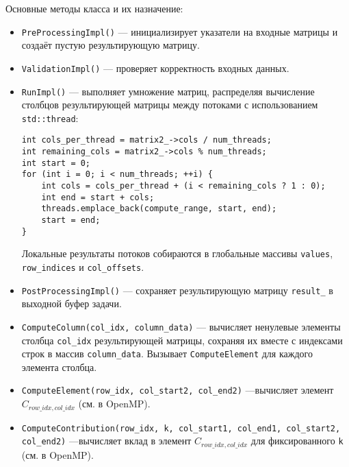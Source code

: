\documentclass[12pt]{extarticle}
\begin{document}
Основные методы класса и их назначение:
\begin{itemize}
    \item \texttt{PreProcessingImpl()} — инициализирует указатели на входные матрицы и создаёт пустую результирующую матрицу.
    \item \texttt{ValidationImpl()} — проверяет корректность входных данных.
    \item \texttt{RunImpl()} — выполняет умножение матриц, распределяя вычисление столбцов результирующей матрицы между потоками с использованием \texttt{std::thread}:
    \begin{lstlisting}[caption={Распределение столбцов между потоками в методе RunImpl},label={lst:stl_run}]
int cols_per_thread = matrix2_->cols / num_threads;
int remaining_cols = matrix2_->cols % num_threads;
int start = 0;
for (int i = 0; i < num_threads; ++i) {
    int cols = cols_per_thread + (i < remaining_cols ? 1 : 0);
    int end = start + cols;
    threads.emplace_back(compute_range, start, end);
    start = end;
}
    \end{lstlisting}
    Локальные результаты потоков собираются в глобальные массивы \texttt{values}, \texttt{row\_indices} и \texttt{col\_offsets}.
    \item \texttt{PostProcessingImpl()} — сохраняет результирующую матрицу \texttt{result\_} в выходной буфер задачи.
    \item \texttt{ComputeColumn(col\_idx, column\_data)} — вычисляет ненулевые элементы столбца \texttt{col\_idx} результирующей матрицы, сохраняя их вместе с индексами строк в массив \texttt{column\_data}. Вызывает \texttt{ComputeElement} для каждого элемента столбца.
    \item \texttt{ComputeElement(row\_idx, col\_start2, col\_end2)} —вычисляет элемент $C_{row\_idx, col\_idx}$ (см. в OpenMP).
    \item \texttt{ComputeContribution(row\_idx, k, col\_start1, col\_end1, col\_start2, col\_end2)} —вычисляет вклад в элемент  $C_{row\_idx, col\_idx}$  для фиксированного \texttt{k} (см. в OpenMP).
\end{itemize}
\end{document}
